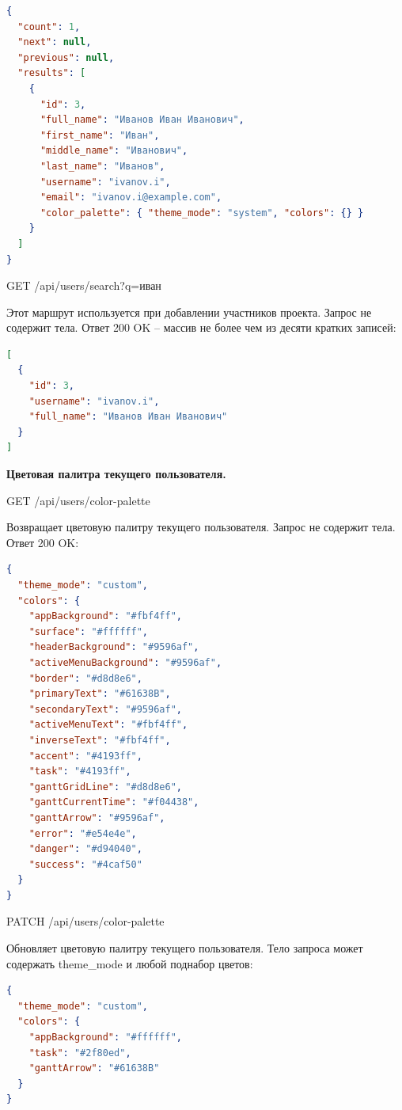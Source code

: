 \begin{lstlisting}[numbers=none, language=json]
{
  "count": 1,
  "next": null,
  "previous": null,
  "results": [
    {
      "id": 3,
      "full_name": "Иванов Иван Иванович",
      "first_name": "Иван",
      "middle_name": "Иванович",
      "last_name": "Иванов",
      "username": "ivanov.i",
      "email": "ivanov.i@example.com",
      "color_palette": { "theme_mode": "system", "colors": {} }
    }
  ]
}
\end{lstlisting}


GET /api/users/search?q=иван

Этот маршрут используется при добавлении участников проекта. Запрос не содержит тела. Ответ 200 OK -- массив не более чем из десяти кратких записей:

\begin{lstlisting}[numbers=none, language=json]
[
  {
    "id": 3,
    "username": "ivanov.i",
    "full_name": "Иванов Иван Иванович"
  }
]
\end{lstlisting}


\textbf{Цветовая палитра текущего пользователя.}

GET /api/users/color-palette

Возвращает цветовую палитру текущего пользователя. Запрос не содержит тела. Ответ 200 OK:

\begin{lstlisting}[numbers=none, language=json]
{
  "theme_mode": "custom",
  "colors": {
    "appBackground": "#fbf4ff",
    "surface": "#ffffff",
    "headerBackground": "#9596af",
    "activeMenuBackground": "#9596af",
    "border": "#d8d8e6",
    "primaryText": "#61638B",
    "secondaryText": "#9596af",
    "activeMenuText": "#fbf4ff",
    "inverseText": "#fbf4ff",
    "accent": "#4193ff",
    "task": "#4193ff",
    "ganttGridLine": "#d8d8e6",
    "ganttCurrentTime": "#f04438",
    "ganttArrow": "#9596af",
    "error": "#e54e4e",
    "danger": "#d94040",
    "success": "#4caf50"
  }
}
\end{lstlisting}


PATCH /api/users/color-palette

Обновляет цветовую палитру текущего пользователя. Тело запроса может содержать theme\_mode и любой поднабор цветов:

\begin{lstlisting}[numbers=none, language=json]
{
  "theme_mode": "custom",
  "colors": {
    "appBackground": "#ffffff",
    "task": "#2f80ed",
    "ganttArrow": "#61638B"
  }
}
\end{lstlisting}


